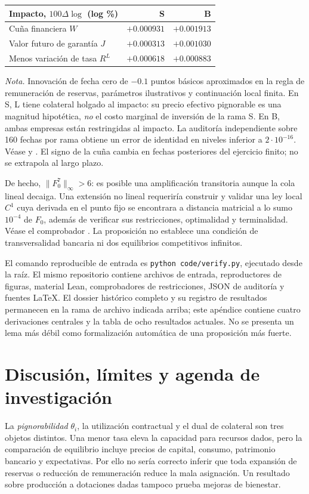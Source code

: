 \begin{center}
\begin{tabular}{lrr}
\toprule
Impacto, $100\Delta\log$ (log \%) & S & B\\
\midrule
Cuña financiera $W$ & $+0.000931$ & $+0.001913$\\
Valor futuro de garantía $J$ & $+0.000313$ & $+0.001030$\\
Menos variación de tasa $R^L$ & $+0.000618$ & $+0.000883$\\
\bottomrule
\end{tabular}
\end{center}
\noindent\emph{Nota.} Innovación de fecha cero de $-0.1$
puntos básicos aproximados en la regla de remuneración de
reservas, parámetros ilustrativos y continuación local
finita. En S, L tiene colateral holgado al impacto:
su precio efectivo pignorable es una magnitud hipotética,
\emph{no} el costo marginal de inversión de la rama S.
En B, ambas empresas están restringidas al impacto.
La auditoría independiente sobre 160 fechas por rama
obtiene un error de identidad en niveles inferior a
$2\cdot10^{-16}$. Véase
y .
El signo de la cuña cambia en fechas posteriores del
ejercicio finito; no se extrapola al largo plazo.

De hecho, $\|F_0^7\|_\infty>6$: es posible una
amplificación transitoria aunque la cola lineal decaiga.
Una extensión no lineal requeriría construir y validar una
ley local $C^1$ cuya derivada en el punto fijo se encontrara
a distancia matricial a lo sumo $10^{-4}$ de $F_0$,
además de verificar sus restricciones, optimalidad y terminalidad. Véase el comprobador
.
La proposición no establece una condición de transversalidad
bancaria ni dos equilibrios competitivos infinitos.

El comando reproducible de entrada es
\texttt{python code/verify.py}, ejecutado desde la raíz.
El mismo repositorio contiene archivos de entrada,
reproductores de figuras, material Lean, comprobadores
de restricciones, JSON de auditoría y fuentes \LaTeX{}.
El dossier histórico completo y su registro de resultados
permanecen en la rama de archivo indicada arriba;
este apéndice contiene cuatro derivaciones centrales y la
tabla de ocho resultados actuales. No se presenta un lema
más débil como formalización automática de una proposición
más fuerte.

\section{Discusión, límites y agenda de investigación}
\label{sec:compact_discussion}
La \emph{pignorabilidad} \(\theta_i\), la utilización
contractual y el dual de colateral son tres objetos
distintos. Una menor tasa eleva la capacidad para
recursos dados, pero la comparación de equilibrio incluye
precios de capital, consumo, patrimonio bancario y
expectativas. Por ello no sería correcto inferir que
toda expansión de reservas o reducción de remuneración
reduce la mala asignación. Un resultado sobre producción
a dotaciones dadas tampoco prueba mejoras de bienestar.

